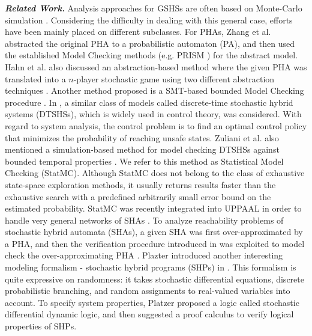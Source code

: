 {\it {\bf Related Work.}} Analysis approaches for GSHSs are often based on Monte-Carlo simulation \cite{blom2004particle}. Considering the difficulty in dealing with this general case, efforts have been mainly placed on different subclasses. For PHAs, Zhang et al. \cite{zhang2012safety} abstracted the original PHA to a probabilistic automaton (PA), and then used the established Model Checking methods (e.g. PRISM \cite{website:prism}) for the abstract model. Hahn et al. also discussed an abstraction-based method where the given PHA was translated into a $n$-player stochastic game using two different abstraction techniques \cite{hahn2011game}. Another method proposed is a SMT-based bounded Model Checking procedure \cite{franzle2008stochastic}. In \cite{amin2006reachability, abate2007probabilistic, abate2011two, abate2011quantitative}, a similar class of models called discrete-time stochastic hybrid systems (DTSHSs), which is widely used in control theory, was considered. With regard to system analysis, the control problem is to find an optimal control policy that minimizes the probability of reaching unsafe states. Zuliani et al. also mentioned a simulation-based method for model checking DTSHSs against bounded temporal properties \cite{zuliani2010bayesian}. We refer to this method as Statistical Model Checking (StatMC).  Although StatMC does not belong to the class of exhaustive state-space exploration methods, it usually returns results faster than the exhaustive search with a predefined arbitrarily small error bound on the estimated probability. StatMC was recently integrated into UPPAAL \cite{larsen1997uppaal} in order to handle very general networks of SHAs \cite{david2012statistical}. To analyze reachability problems of stochastic hybrid automata (SHAs), a given SHA was first over-approximated by a PHA, and then the verification procedure introduced in \cite{zhang2012safety} was exploited to model check the over-approximating PHA \cite{franzle2011measurability}. Plazter introduced another interesting modeling formalism - stochastic hybrid programs (SHPs) in \cite{platzer2011stochastic}. This formalism is quite expressive on randomness: it takes stochastic differential equations, discrete probabilistic branching, and random assignments to real-valued variables into account. To specify system properties, Platzer proposed a logic called stochastic differential dynamic logic, and then suggested a proof calculus to verify logical properties of SHPs. 


